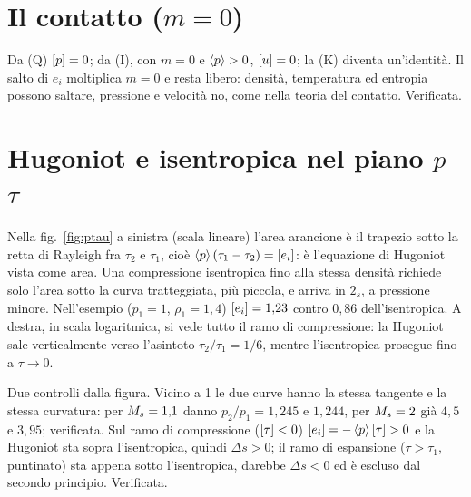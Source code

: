 \section*{Il contatto ($m=0$)}
Da (Q) $\left[p\right]=0$; da (I), con $m=0$ e $\left\langle p\right\rangle>0$, $\left[u\right]=0$; la (K) diventa un'identità. Il salto di $e_i$
moltiplica $m=0$ e resta libero: densità, temperatura ed entropia possono saltare, pressione e velocità no, come
nella teoria del contatto. Verificata.

\section*{Hugoniot e isentropica nel piano $p$--$\tau$}
Nella fig.~\ref{fig:ptau} a sinistra (scala lineare) l'area arancione è il trapezio sotto la retta di Rayleigh fra
$\tau_2$ e $\tau_1$, cioè $\left\langle p\right\rangle(\tau_1-\tau_2)=\left[e_i\right]$: è l'equazione di Hugoniot vista come area. Una
compressione isentropica fino alla stessa densità richiede solo l'area sotto la curva tratteggiata, più piccola, e
arriva in $2_s$, a pressione minore. Nell'esempio ($p_1=1$, $\rho_1=1{,}4$) $\left[e_i\right]=1{,}23$ contro $0{,}86$
dell'isentropica. A destra, in scala logaritmica, si vede tutto il ramo di compressione: la Hugoniot sale
verticalmente verso l'asintoto $\tau_2/\tau_1=1/6$, mentre l'isentropica prosegue fino a $\tau\to0$.

Due controlli dalla figura. Vicino a 1 le due curve hanno la stessa tangente e la stessa curvatura: per $M_{s}=1{,}1$
danno $p_2/p_1=1{,}245$ e $1{,}244$, per $M_{s}=2$ già $4{,}5$ e $3{,}95$; verificata. Sul ramo di compressione
($\left[\tau\right]<0$) $\left[e_i\right]=-\left\langle p\right\rangle\left[\tau\right]>0$ e la Hugoniot sta sopra l'isentropica, quindi $\Delta s>0$; il ramo
di espansione ($\tau>\tau_1$, puntinato) sta appena sotto l'isentropica, darebbe $\Delta s<0$ ed è escluso dal
secondo principio. Verificata.

